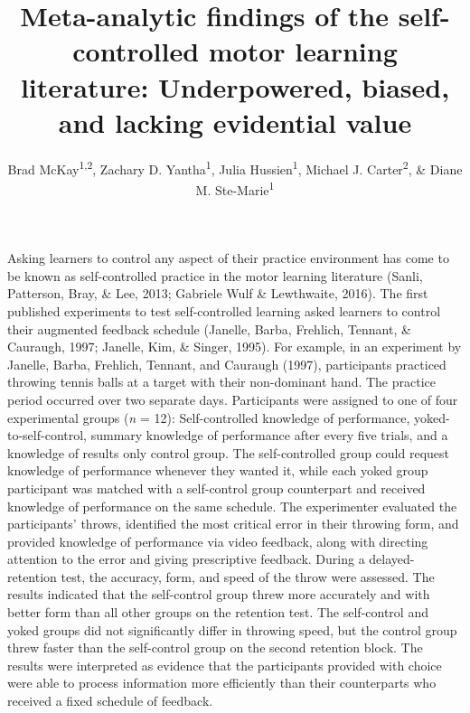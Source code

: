 \documentclass[
  english,
  man,floatsintext]{apa7}
\title{Meta-analytic findings of the self-controlled motor learning literature: Underpowered, biased, and lacking evidential value}
\author{Brad McKay\textsuperscript{1,2}, Zachary D. Yantha\textsuperscript{1}, Julia Hussien\textsuperscript{1}, Michael J. Carter\textsuperscript{2}, \& Diane M. Ste-Marie\textsuperscript{1}}
\date{}
\affiliation{\vspace{0.5cm}\textsuperscript{1} School of Human Kinetics University of Ottawa\\\textsuperscript{2} Department of Kinesiology McMaster University}
\begin{document}
\maketitle

Asking learners to control any aspect of their practice environment has come to be known as self-controlled practice in the motor learning literature (Sanli, Patterson, Bray, \& Lee, 2013; Gabriele Wulf \& Lewthwaite, 2016). The first published experiments to test self-controlled learning asked learners to control their augmented feedback schedule (Janelle, Barba, Frehlich, Tennant, \& Cauraugh, 1997; Janelle, Kim, \& Singer, 1995). For example, in an experiment by Janelle, Barba, Frehlich, Tennant, and Cauraugh (1997), participants practiced throwing tennis balls at a target with their non-dominant hand. The practice period occurred over two separate days. Participants were assigned to one of four experimental groups (\emph{n} = 12): Self-controlled knowledge of performance, yoked-to-self-control, summary knowledge of performance after every five trials, and a knowledge of results only control group. The self-controlled group could request knowledge of performance whenever they wanted it, while each yoked group participant was matched with a self-control group counterpart and received knowledge of performance on the same schedule. The experimenter evaluated the participants' throws, identified the most critical error in their throwing form, and provided knowledge of performance via video feedback, along with directing attention to the error and giving prescriptive feedback. During a delayed-retention test, the accuracy, form, and speed of the throw were assessed. The results indicated that the self-control group threw more accurately and with better form than all other groups on the retention test. The self-control and yoked groups did not significantly differ in throwing speed, but the control group threw faster than the self-control group on the second retention block. The results were interpreted as evidence that the participants provided with choice were able to process information more efficiently than their counterparts who received a fixed schedule of feedback.
\end{document}
